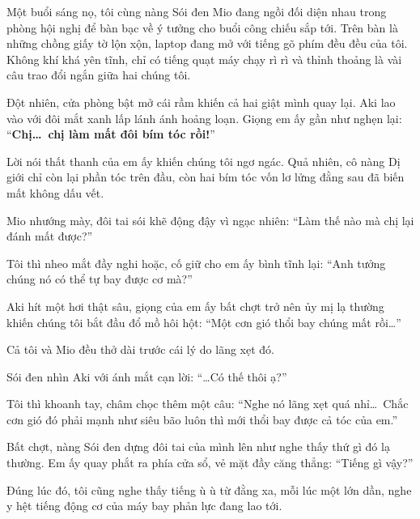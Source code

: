 \documentclass[../main.tex]{subfiles}
\begin{document}


Một buổi sáng nọ, tôi cùng nàng Sói đen Mio đang ngồi đối diện nhau trong phòng hội nghị để bàn bạc về ý tưởng cho buổi công chiếu sắp tới. Trên bàn là những chồng giấy tờ lộn xộn, laptop đang mở với tiếng gõ phím đều đều của tôi. Không khí khá yên tĩnh, chỉ có tiếng quạt máy chạy rì rì và thỉnh thoảng là vài câu trao đổi ngắn giữa hai chúng tôi.

Đột nhiên, cửa phòng bật mở cái rầm khiến cả hai giật mình quay lại. Aki lao vào với đôi mắt xanh lấp lánh ánh hoảng loạn. Giọng em ấy gần như nghẹn lại: ``\textbf{Chị\dots\ chị làm mất đôi bím tóc rồi!}''


Lời nói thất thanh của em ấy khiến chúng tôi ngơ ngác. Quả nhiên, cô nàng Dị giới chỉ còn lại phần tóc trên đầu, còn hai bím tóc vốn lơ lửng đằng sau đã biến mất không dấu vết.

Mio nhướng mày, đôi tai sói khẽ động đậy vì ngạc nhiên: ``Làm thế nào mà chị lại đánh mất được?''

Tôi thì nheo mắt đầy nghi hoặc, cố giữ cho em ấy bình tĩnh lại: ``Anh tưởng chúng nó có thể tự bay được cơ mà?''

Aki hít một hơi thật sâu, giọng của em ấy bất chợt trở nên ủy mị lạ thường khiến chúng tôi bắt đầu đổ mồ hôi hột: ``Một cơn gió thổi bay chúng mất rồi\dots''

Cả tôi và Mio đều thở dài trước cái lý do lãng xẹt đó.

Sói đen nhìn Aki với ánh mắt cạn lời: ``\dots Có thế thôi ạ?''

Tôi thì khoanh tay, châm chọc thêm một câu: ``Nghe nó lãng xẹt quá nhỉ\dots\ Chắc cơn gió đó phải mạnh như siêu bão luôn thì mới thổi bay được cả tóc của em.''

Bất chợt, nàng Sói đen dựng đôi tai của mình lên như nghe thấy thứ gì đó lạ thường. Em ấy quay phắt ra phía cửa sổ, vẻ mặt đầy căng thẳng: ``Tiếng gì vậy?''

Đúng lúc đó, tôi cũng nghe thấy tiếng ù ù từ đằng xa, mỗi lúc một lớn dần, nghe y hệt tiếng động cơ của máy bay phản lực đang lao tới.

\end{document}
